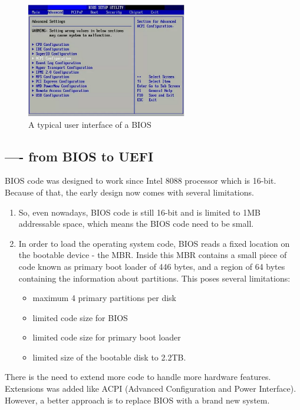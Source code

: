 \begin{figure}[hbt]
  \centerline{\includegraphics[height=5cm,
    angle=0]{./images/BIOS_interface.eps}}
  \caption{A typical user interface of a BIOS}
  \label{fig:BIOS_interface}
\end{figure}

\subsection{---- from BIOS to UEFI}
\label{sec:UEFI_BIOS}

BIOS code was designed to work since Intel 8088 processor which is 16-bit.
Because of that, the early design now comes with several limitations.
\begin{enumerate}
  \item  So, even nowadays, BIOS code is still 16-bit and is limited to 1MB
  addressable space, which means the BIOS code need to be small. 

  \item  In order to load the operating system code, BIOS reads a fixed location
  on the bootable device - the MBR. Inside this MBR contains a small piece of code known
as primary boot loader of 446 bytes, and a region of 64 bytes containing the
information about partitions. This poses several limitations:
\begin{itemize}
  \item maximum 4 primary partitions per disk
  \item limited code size for BIOS
  \item limited code size for primary boot loader
  \item limited size of the bootable disk to 2.2TB.
\end{itemize}
\end{enumerate}

There is the need to extend more code to handle more hardware features.
Extensions was added like ACPI (Advanced Configuration and Power Interface).
However, a better approach is to replace BIOS with a brand new system.

